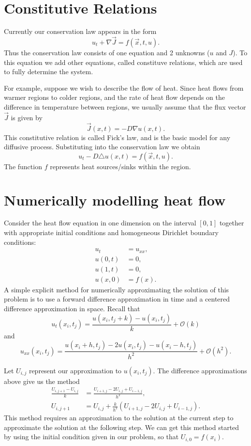 \section{Constitutive Relations}
Currently our conservation law appears in the form 
\[u_t + \nabla \vec{J} = f(\vec{x},t,u).\]
Thus the conservation law consists of one equation and 2 unknowns ($u$ and $J$).
To this equation we add other equations, called constituve relations, which are used to fully determine the system. 

For example, suppose we wish to describe the flow of heat. Since heat flows from warmer regions to colder regions, and the rate of heat flow depends on the difference in temperature between regions, we usually assume that the flux vector $\vec{J}$ is given by 
\[
\vec{J}(x,t) = -D \nabla u(x,t).
\]
This constitutive relation is called Fick's law, and is the basic model for any diffusive process. Substituting into the conservation law we obtain 
\[u_t -D \triangle u(x,t) = f(\vec{x},t,u).\]  
The function $f$ represents heat sources/sinks within the region. 

\section{Numerically modelling heat flow}
Consider the heat flow equation in one dimension on the interval $[0,1]$ together with appropriate initial conditions and homogeneous Dirichlet boundary conditions: 
\begin{align*}
	u_t &= u_{xx},\\
	u(0,t) &= 0,\\
	u(1,t) &= 0,\\
	u(x,0) &= f(x).
\end{align*}
A simple explicit method for numerically approximating the solution of this problem is to use a forward difference approximation in time and a centered difference approximation in space. Recall that
\[u_t(x_i,t_j) = \frac{u(x_i,t_j + k) - u(x_i,t_j)}{k} + \mathcal{O}(k)
\]
 and 
\[u_{xx}(x_i,t_j) = \frac{u(x_i + h,t_j )-2 u(x_i,t_j)- u(x_i - h,t_j)}{h^2} + \mathcal{O}(h^2).
\]

Let $U_{i,j}$ represent our approximation to $u(x_i,t_j)$. The difference approximations above give us the method 
\begin{align*}
	\frac{U_{i,j+1} - U_{i,j}}{k} &= \frac{U_{i+1,j}- 2U_{i,j} + U_{i-1,j} }{h^2} ,\\
	U_{i,j+1} &= U_{i,j} + \frac{k}{h^2} (U_{i+1,j}- 2U_{i,j} + U_{i-1,j} ).
\end{align*}
This method requires an approximation to the solution at the current step to approximate the solution at the following step.
We can get this method started by using the initial condition given in our problem, so that $U_{i,0} = f(x_i)$. 

